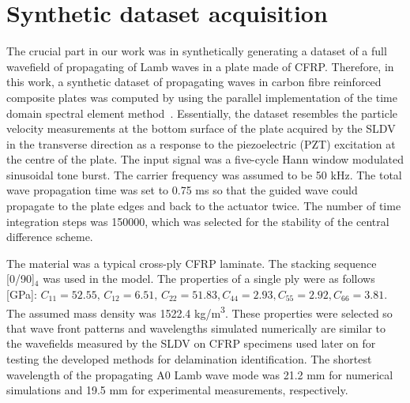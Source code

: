 \section{Synthetic dataset acquisition}
\label{sec41}
The crucial part in our work was in synthetically generating a dataset of a full wavefield of propagating of Lamb waves in a plate made of CFRP.
Therefore, in this work, a synthetic dataset of propagating waves in carbon fibre reinforced composite plates was computed by using the parallel implementation of the time domain spectral element method~\cite{Kudela2020}.
Essentially, the dataset resembles the particle velocity measurements at the bottom surface of the plate acquired by the SLDV in the transverse direction as a response to the piezoelectric (PZT) excitation at the centre of the plate. 
The input signal was a five-cycle Hann window modulated sinusoidal tone burst. The carrier frequency was assumed to be 50 kHz. 
The total wave propagation time was set to 0.75 ms so that the guided wave could propagate to the plate edges and back to the actuator twice.
The number of time integration steps was 150000, which was selected for the stability of the central difference scheme.

The material was a typical cross-ply CFRP laminate. 
The stacking sequence [0/90]\(_4\) was used in the model. 
The properties of a single ply were as follows [GPa]:
\(C_{11} = 52.55, \, C_{12} = 6.51, \, C_{22} = 51.83, C_{44} = 2.93, C_{55} = 2.92, C_{66} = 3.81\). 
The assumed mass density was 1522.4 kg/m\textsuperscript{3}.
These properties were selected so that wave front patterns and wavelengths simulated numerically are similar to the wavefields measured by the SLDV on CFRP specimens used later on for testing the developed methods for delamination identification.
The shortest wavelength of the propagating A0 Lamb wave mode was 21.2 mm for numerical simulations and 19.5 mm for experimental measurements, respectively.

